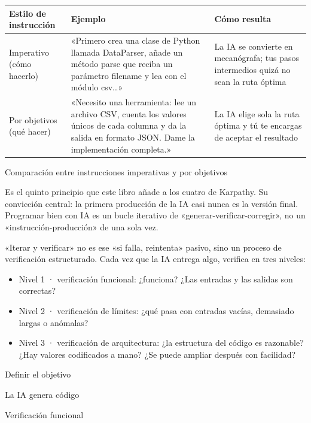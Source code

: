 \begin{center}
\begin{tabularx}{\linewidth}{|X|X|X|}
\hline
\textbf{Estilo de instrucción} & \textbf{Ejemplo} & \textbf{Cómo resulta} \tabularnewline
\hline
Imperativo (cómo hacerlo) & «Primero crea una clase de Python llamada DataParser, añade un método parse que reciba un parámetro filename y lea con el módulo csv…» & La IA se convierte en mecanógrafa; tus pasos intermedios quizá no sean la ruta óptima \tabularnewline
Por objetivos (qué hacer) & «Necesito una herramienta: lee un archivo CSV, cuenta los valores únicos de cada columna y da la salida en formato JSON. Dame la implementación completa.» & La IA elige sola la ruta óptima y tú te encargas de aceptar el resultado \tabularnewline
\hline
\end{tabularx}
\end{center}

\begin{center}\small\color{gray}Comparación entre instrucciones imperativas y por objetivos\end{center}


Es el quinto principio que este libro añade a los cuatro de Karpathy. Su convicción central: la primera producción de la IA casi nunca es la versión final. Programar bien con IA es un bucle iterativo de «generar-verificar-corregir», no un «instrucción-producción» de una sola vez.

«Iterar y verificar» no es ese «si falla, reintenta» pasivo, sino un proceso de verificación estructurado. Cada vez que la IA entrega algo, verifica en tres niveles:

\begin{itemize}
  \item Nivel 1 · verificación funcional: ¿funciona? ¿Las entradas y las salidas son correctas?
  \item Nivel 2 · verificación de límites: ¿qué pasa con entradas vacías, demasiado largas o anómalas?
  \item Nivel 3 · verificación de arquitectura: ¿la estructura del código es razonable? ¿Hay valores codificados a mano? ¿Se puede ampliar después con facilidad?
\end{itemize}

Definir el objetivo

La IA genera código

Verificación funcional

